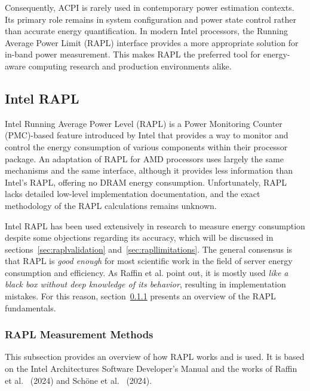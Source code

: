 Consequently, ACPI is rarely used in contemporary power estimation contexts. Its primary role remains in system configuration and power state control rather than accurate energy quantification. In modern Intel processors, the Running Average Power Limit (RAPL) interface provides a more appropriate solution for in-band power measurement. This makes RAPL the preferred tool for energy-aware computing research and production environments alike.

\subsection{Intel RAPL}
\label{sec:RAPL}
Intel Running Average Power Level (RAPL) is a Power Monitoring Counter (PMC)-based feature introduced by Intel that provides a way to monitor and control the energy consumption of various components within their processor package\parencite{projectexigence_rapl}. An adaptation of RAPL for AMD processors uses largely the same mechanisms and the same interface\parencite{amd_energy}, although it provides less information than Intel's RAPL, offering no DRAM energy consumption\parencite{schone2021energy}. Unfortunately, RAPL lacks detailed low-level implementation documentation, and the exact methodology of the RAPL calculations remains unknown\parencite{jay2023experimental}.

Intel RAPL has been used extensively in research to measure energy consumption\parencite{kennes2023measuring} despite some objections regarding its accuracy, which will be discussed in sections~\ref{sec:raplvalidation} and~\ref{sec:rapllimitations}. The general consensus is that RAPL is \textit{good enough} for most scientific work in the field of server energy consumption and efficiency. As Raffin et al.\parencite{raffin2024dissecting} point out, it is mostly used \textit{like a black box without deep knowledge of its behavior}, resulting in implementation mistakes. For this reason, section~\ref{sec:raplmethodology} presents an overview of the RAPL fundamentals.

\subsubsection{RAPL Measurement Methods}
\label{sec:raplmethodology}
This subsection provides an overview of how RAPL works and is used. It is based on the Intel Architectures Software Developer’s Manual\parencite[Section 16.10]{intel-sdm} and the works of Raffin et al.\ \parencite{raffin2024dissecting} (2024) and Schöne et al.\ \parencite{schone2024energy} (2024).

